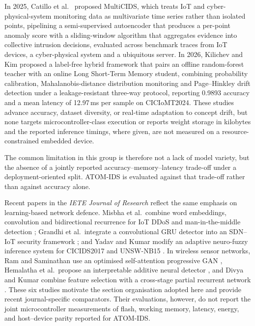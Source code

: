 \documentclass[10pt,letterpaper,twocolumn]{article}
\begin{document}
In 2025, Catillo et al.\ \cite{catillo2025multicids} proposed MultiCIDS, which
treats IoT and cyber-physical-system monitoring data as multivariate time
series rather than isolated points, pipelining a semi-supervised autoencoder
that produces a per-point anomaly score with a sliding-window algorithm that
aggregates evidence into collective intrusion decisions, evaluated across
benchmark traces from IoT devices, a cyber-physical system and a ubiquitous
server. In 2026, Kilichev and Kim \cite{kilichev2026hybrid} proposed a
label-free hybrid framework that pairs an offline random-forest teacher with an
online Long Short-Term Memory student, combining probability calibration,
Mahalanobis-distance distribution monitoring and Page--Hinkley drift detection
under a leakage-resistant three-way protocol, reporting 0.9893 accuracy and a
mean latency of 12.97\,ms per sample on CICIoMT2024. These studies advance
accuracy, dataset diversity, or real-time adaptation to concept drift, but none
targets microcontroller-class execution or reports weight storage in
kilobytes and the reported inference timings, where given, are not measured
on a resource-constrained embedded device.

The common limitation in this group is therefore not a lack of model variety,
but the absence of a jointly reported accuracy--memory--latency trade-off
under a deployment-oriented split. ATOM-IDS is evaluated against that
trade-off rather than against accuracy alone.

Recent papers in the \emph{IETE Journal of Research} reflect the same emphasis
on learning-based network defence. Misbha et al.\ combine word embeddings,
convolution and bidirectional recurrence for IoT DDoS and man-in-the-middle
detection \cite{misbha2024security}; Grandhi et al.\ integrate a convolutional
GRU detector into an SDN--IoT security framework
\cite{grandhi2025secure}; and Yadav and Kumar modify an adaptive
neuro-fuzzy inference system for CICIDS2017 and UNSW-NB15
\cite{yadav2026anfis}. In wireless sensor networks, Ram and Saminathan use an
optimised self-attention progressive GAN \cite{ram2025sapgan}, Hemalatha et
al.\ propose an interpretable additive neural detector
\cite{hemalatha2025igann}, and Divya and Kumar combine feature selection with
a cross-stage partial recurrent network \cite{divya2026crossstage}. These six
studies motivate the section organisation adopted here and provide recent
journal-specific comparators. Their evaluations, however, do not report the
joint microcontroller measurements of flash, working memory, latency, energy,
and host--device parity reported for ATOM-IDS.
\end{document}

